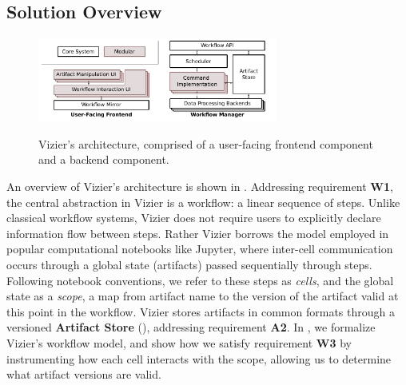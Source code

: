 

\pagebreak[4]
\subsection{Solution Overview}
\label{sec:solution-overview}

\begin{figure}
  \centering
  \includegraphics[width=0.7\textwidth]{graphics/systemarch}\\[-5mm]
  \caption{Vizier's architecture, comprised of a user-facing frontend component and a backend component.}\label{fig:vizier-architecture}
\end{figure}
An overview of Vizier's architecture is shown in .
Addressing requirement \textbf{W1}, the central abstraction in Vizier is a workflow: a linear sequence of steps. %
Unlike classical workflow systems, Vizier does not require users to explicitly declare information flow between steps.
Rather Vizier borrows the model employed in popular computational notebooks like Jupyter, where inter-cell communication occurs through a global state (artifacts) passed sequentially through steps.
Following notebook conventions, we refer to these steps as \emph{cells}, and the global state as a \emph{scope}, a map from artifact name to the version of the artifact valid at this point in the workflow. Vizier stores artifacts in common formats through a versioned \textbf{Artifact Store} (), addressing requirement \textbf{A2}.
In , we formalize Vizier's workflow model, and show how we satisfy requirement \textbf{W3} by instrumenting how each cell interacts with the scope, allowing us to determine what artifact versions are valid.

